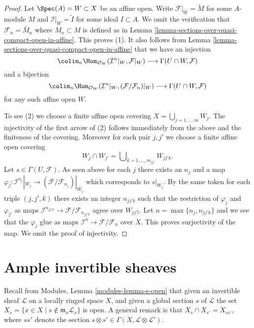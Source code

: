 \begin{proof}
Let $\Spec(A) = W \subset X$ be an affine open.
Write $\mathcal{F}|_W = \widetilde{M}$ for some $A$-module $M$
and $\mathcal{I}|_W = \widetilde{I}$ for some ideal $I \subset A$.
We omit the verification that $\mathcal{F}_n = \widetilde{M_n}$ where
$M_n \subset M$ is defined as in
Lemma \ref{lemma-sections-over-quasi-compact-open-in-affine}.
This proves (1). It also follows from
Lemma \ref{lemma-sections-over-quasi-compact-open-in-affine}
that we have an injection
$$
\colim_n  \Hom_{\mathcal{O}_W}(
\mathcal{I}^n|_W, \mathcal{F}|_W)
\longrightarrow
\Gamma(U \cap W, \mathcal{F})
$$
and a bijection
$$
\colim_n  \Hom_{\mathcal{O}_W}(
\mathcal{I}^n|_W, (\mathcal{F}/\mathcal{F}_n)|_W)
\longrightarrow
\Gamma(U \cap W, \mathcal{F})
$$
for any such affine open $W$.

\medskip\noindent
To see (2) we choose a finite affine open covering
$X = \bigcup_{j = 1, \ldots, m} W_j$.
The injectivity of the first arrow of (2) follows immediately from
the above and the finiteness of the covering.
Moreover for each pair
$j, j'$ we choose a finite affine open covering
$$
W_j \cap W_{j'} = \bigcup\nolimits_{k = 1, \ldots, m_{jj'}} W_{jj'k}.
$$
Let $s \in \Gamma(U, \mathcal{F})$. As seen above for each $j$ there exists
an $n_j$ and a map
$\varphi_j : \mathcal{I}^{n_j}|_{W_j} \to
(\mathcal{F}/\mathcal{F}_{n_j})|_{W_j}$
which corresponds to $s|_{W_j}$.
By the same token for each triple $(j, j', k)$ there exists an integer
$n_{jj'k}$ such that the restriction of $\varphi_j$ and $\varphi_{j'}$
as maps $\mathcal{I}^{n_{jj'k}} \to \mathcal{F}/\mathcal{F}_{n_{jj'k}}$
agree over $W_{jj'l}$. Let $n = \max\{n_j, n_{jj'k}\}$ and we see that
the $\varphi_j$ glue as maps
$\mathcal{I}^n \to \mathcal{F}/\mathcal{F}_n$ over $X$.
This proves surjectivity of the map. We omit the proof of injectivity.
\end{proof}













\section{Ample invertible sheaves}
\label{section-ample}

\noindent
Recall from Modules, Lemma \ref{modules-lemma-s-open}
that given an invertible sheaf $\mathcal{L}$ on a locally ringed
space $X$, and given a global section $s$ of $\mathcal{L}$
the set $X_s = \{x \in X \mid s \not \in \mathfrak m_x\mathcal{L}_x\}$
is open. A general remark is that
$X_s \cap X_{s'} = X_{ss'}$, where $ss'$ denote
the section $s \otimes s' \in \Gamma(X, \mathcal{L} \otimes \mathcal{L}')$.

